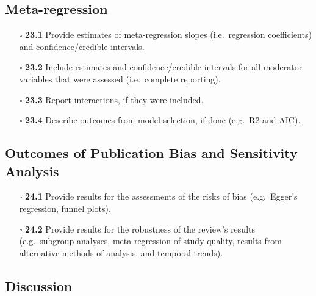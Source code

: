 \documentclass[11pt]{article}
\def\tightlist{}
\begin{document}
\begin{Form}
\subsection{Meta-regression}\label{meta-regression}

\begin{itemize}
\tightlist
\item[$\square$]
  \textbf{23.1} Provide estimates of meta-regression slopes
  (i.e.~regression coefficients) and confidence/credible intervals.
\item[$\square$]
  \textbf{23.2} Include estimates and confidence/credible intervals for
  all moderator variables that were assessed (i.e.~complete reporting).
\item[$\square$]
  \textbf{23.3} Report interactions, if they were included.
\item[$\square$]
  \textbf{23.4} Describe outcomes from model selection, if done (e.g.~R2
  and AIC).
\end{itemize}

\subsection{Outcomes of Publication Bias and Sensitivity
Analysis}\label{outcomes-of-publication-bias-and-sensitivity-analysis}

\begin{itemize}
\tightlist
\item[$\square$]
  \textbf{24.1} Provide results for the assessments of the risks of bias
  (e.g.~Egger's regression, funnel plots).
\item[$\square$]
  \textbf{24.2} Provide results for the robustness of the review's
  results (e.g.~subgroup analyses, meta-regression of study quality,
  results from alternative methods of analysis, and temporal trends).
\end{itemize}

\subsection{Discussion}\label{discussion}


\end{Form}
\end{document}
